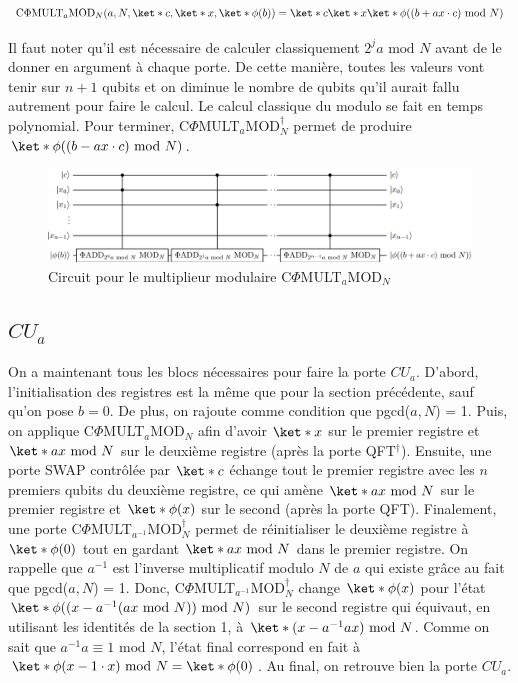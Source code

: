 \begin{equation}
    \text{C}\Phi\text{MULT}_a\text{MOD}_N (a, N, \ket*{c}, \ket*{x}, \ket*{\phi(b)}) = \ket*{c} \ket*{x} \ket*{\phi((b + ax\cdot c) \text{ mod } N)}
\end{equation}

Il faut noter qu'il est nécessaire de calculer classiquement $2^j a \text{ mod } N$ avant de le donner en argument à chaque porte. De cette manière, toutes les valeurs vont tenir sur $n+1$ qubits et on diminue le nombre de qubits qu'il aurait fallu autrement pour faire le calcul. Le calcul classique du modulo se fait en temps polynomial. Pour terminer, C$\Phi$MULT$_a$MOD$_N^\dag$ permet de produire $\ket*{\phi((b - ax \cdot c)\text{ mod } N)}$.

\begin{figure}[H]
    \centering
    \includegraphics[scale=0.63]{images/phimultmod.png}
    \caption{Circuit pour le multiplieur modulaire C$\Phi$MULT$_a$MOD$_N$}
\end{figure}

\subsection{$CU_a$}
On a maintenant tous les blocs nécessaires pour faire la porte $CU_a$. D'abord, l'initialisation des registres est la même que pour la section précédente, sauf qu'on pose $b=0$. De plus, on rajoute comme condition que pgcd($a, N$) = 1. Puis, on applique C$\Phi$MULT$_a$MOD$_N$ afin d'avoir $\ket*{x}$ sur le premier registre et $\ket*{ax \text{ mod } N}$ sur le deuxième registre (après la porte QFT$^\dag$). Ensuite, une porte SWAP contrôlée par $\ket*{c}$ échange tout le premier registre avec les $n$ premiers qubits du deuxième registre, ce qui amène  $\ket*{ax \text{ mod } N}$ sur le premier registre et $\ket*{\phi(x)}$ sur le second (après la porte QFT). Finalement, une porte C$\Phi$MULT$_{a^{-1}}$MOD$_N^\dag$ permet de réinitialiser le deuxième registre à $\ket*{\phi(0)}$ tout en gardant $\ket*{ax \text{ mod } N}$ dans le premier registre. On rappelle que $a^{-1}$ est l'inverse multiplicatif modulo $N$ de $a$ qui existe grâce au fait que pgcd($a, N$) = 1. Donc, C$\Phi$MULT$_{a^{-1}}$MOD$_N^\dag$ change $\ket*{\phi(x)}$ pour l'état $\ket*{\phi((x - a^{-1}(ax \text{ mod } N)) \text{ mod } N)}$ sur le second registre qui équivaut, en utilisant les identités de la section 1, à $\ket*{(x - a^{-1}a x) \text{ mod } N}$. Comme on sait que $a^{-1}a \equiv 1 \text{ mod } N$, l'état final correspond en fait à $\ket*{\phi(x - 1  \cdot x)\text{ mod } N} = \ket*{\phi(0)}$. Au final, on retrouve bien la porte $CU_a$.

